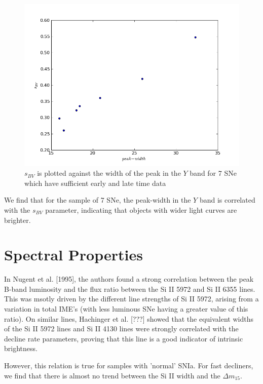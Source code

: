 \documentclass{article}
\begin{document}
\begin{figure}
\includegraphics[width=.6 \textwidth]{../img/peak-width_sbv.png}
\caption{$s_{BV}$ is plotted against the width of the peak in the $Y$ band for 7 SNe which have sufficient early and late time data}
\end{figure}

We find that for the sample of 7 SNe, the peak-width in the $Y$ band is correlated with the $s_{BV}$ parameter, indicating that objects with wider light curves are brighter. 

\section{Spectral Properties}
In Nugent et al. [1995], the authors found a strong correlation between the peak B-band luminosity and the flux ratio between the Si II 5972 and Si II 6355 lines. This was msotly driven by the different line strengths of Si II 5972, arising from a variation in total IME's (with less luminous SNe having a greater value of this ratio). On similar lines, Hachinger et al. [???] showed that the equivalent widths of the Si II 5972 lines and Si II 4130 lines were strongly correlated with the decline rate parameters, proving that this line is a good indicator of intrinsic brightness. 

However, this relation is true for samples with 'normal' SNIa. For fast decliners, we find that there is almost no trend between the Si II width and the $\Delta m_{15}$. 
\end{document}
